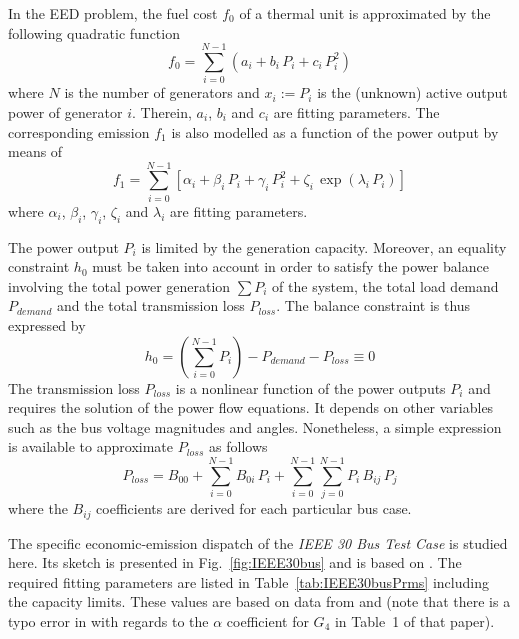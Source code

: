 \documentclass[final,5p,times,twocolumn]{elsarticle}
\newcommand{\figname} {Fig.}
\begin{document}
In the EED problem, the fuel cost $f_0$ of a thermal unit is approximated by the following quadratic
function
\begin{equation}
    f_0 = \sum_{i=0}^{N-1} \left( a_i + b_i\,P_i + c_i\,P_i^2 \right)
\end{equation}
where $N$ is the number of generators and ${x_i:=P_i}$ is the (unknown) active output power of
generator $i$. Therein, $a_i$, $b_i$ and $c_i$ are fitting parameters. The corresponding emission
$f_1$ is also modelled as a function of the power output by means of
\begin{equation}
    f_1 = \sum_{i=0}^{N-1} \left[
		 \alpha_i+\beta_i\,P_i+\gamma_i\,P_i^2 + \zeta_i\,\exp{(\lambda_i\,P_i)}
    \right]
\label{eqn:emission}
\end{equation}
where $\alpha_i$, $\beta_i$, $\gamma_i$, $\zeta_i$ and $\lambda_i$ are fitting parameters.

The power output $P_i$ is limited by the generation capacity. Moreover, an equality constraint $h_0$
must be taken into account in order to satisfy the power balance involving the total power
generation $\sum P_i$ of the system, the total load demand $P_{demand}$ and the total transmission
loss $P_{loss}$. The balance constraint is thus expressed by
\begin{equation}
    h_0 = \left(\sum_{i=0}^{N-1} P_i \right) - P_{demand} - P_{loss} \equiv 0
\end{equation}
The transmission loss $P_{loss}$ is a nonlinear function of the power outputs $P_i$ and requires
the solution of the power flow equations. It depends on other variables such as the bus voltage
magnitudes and angles. Nonetheless, a simple expression is available to approximate $P_{loss}$ as
follows
\begin{equation}
    P_{loss} = B_{00} + \sum_{i=0}^{N-1} B_{0i}\,P_i + \sum_{i=0}^{N-1} \sum_{j=0}^{N-1} P_i \, B_{ij} \, P_j
\end{equation}
where the $B_{ij}$ coefficients are derived for each particular bus case.

The specific economic-emission dispatch of the \emph{IEEE 30 Bus Test Case} is studied here. Its
sketch is presented in \figname~\ref{fig:IEEE30bus} and is based on \citep{yokoyama:87}. The
required fitting parameters are listed in Table~\ref{tab:IEEE30busPrms} including the capacity
limits. These values are based on data from \citep{yokoyama:87} and \citep{abido:03} (note that
there is a typo error in \citep{abido:03} with regards to the $\alpha$ coefficient for $G_4$ in
Table~1 of that paper).
\end{document}
